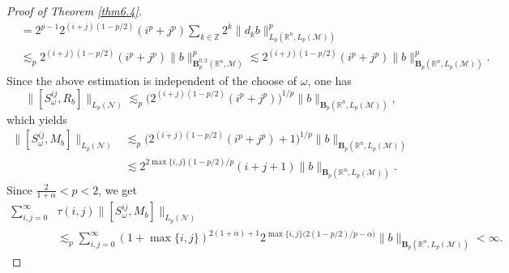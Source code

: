 \documentclass[oneside,english,a4wide]{amsart}
\numberwithin{equation}{section}
\numberwithin{figure}{section}
\theoremstyle{plain}
\theoremstyle{plain}
\theoremstyle{definition}
\theoremstyle{plain}
\theoremstyle{remark}
\theoremstyle{definition}
\theoremstyle{remark}
\theoremstyle{definition}
\newcommand{\8}{\infty}
\begin{document}
\begin{proof}[Proof of Theorem \ref{thm6.4}]
\begin{equation*}
\begin{aligned}
		&=2^{p-1} 2^{(i+j)(1-p/2)} (i^p+j^p) \sum_{k\in\mathbb{Z}}2^{k}\|d_kb\|_{L_p(\mathbb{R}^n,L_p(\mathcal{M}))}^p\\
		&\lesssim_{p}2^{(i+j)(1-p/2)}(i^{p}+j^{p})\|b\|_{\pmb{B}_p^{0, 2}(\mathbb{R}^n,\mathcal{M})}^p\lesssim 2^{(i+j)(1-p/2)}(i^{p}+j^{p})\|b\|_{\pmb{B}_p(\mathbb{R}^n,L_p(\mathcal{M}))}^p.
	\end{aligned}
\end{equation*}
Since the above estimation is independent of the choose of $\omega$, one has
$$ \|[S_\omega^{ij}, R_b]\|_{L_p(\mathcal{N})}\lesssim_{p} \big(2^{(i+j)(1-p/2)}(i^p+j^p)\big)^{1/p}  \|b\|_{\pmb{B}_p(\mathbb{R}^n,L_p(\mathcal{M}))}, $$
which yields
\begin{equation*}
	\begin{aligned}
		\|[S_\omega^{ij}, M_b]\|_{L_p(\mathcal{N})}{}&\lesssim_{p} \big(2^{(i+j)(1-p/2)}(i^p+j^p)+1\big)^{1/p}  \|b\|_{\pmb{B}_p(\mathbb{R}^n,L_p(\mathcal{M}))}\\
		&\lesssim 2^{2\max\{i,j\}(1-p/2)/p}(i+j+1) \|b\|_{\pmb{B}_p(\mathbb{R}^n,L_p(\mathcal{M}))}.
	\end{aligned}
\end{equation*}
Since $\frac{2}{1+\alpha}< p<2$, we get
\begin{equation*}
	\begin{aligned}
		\sum_{i,j=0}^\infty &\tau(i,j)\|[S_\omega^{ij}, M_b]\|_{L_p(\mathcal{N})}\\
		&\lesssim_{p} \sum_{i,j=0}^\infty (1+\max\{i,j\})^{2(1+\alpha)+1}2^{\max\{i,j\}\big(2(1-p/2)/p-\alpha\big)}\|b\|_{\pmb{B}_p(\mathbb{R}^n,L_p(\mathcal{M}))}<\infty.
	\end{aligned}
\end{equation*}

\end{proof}
\end{document}

